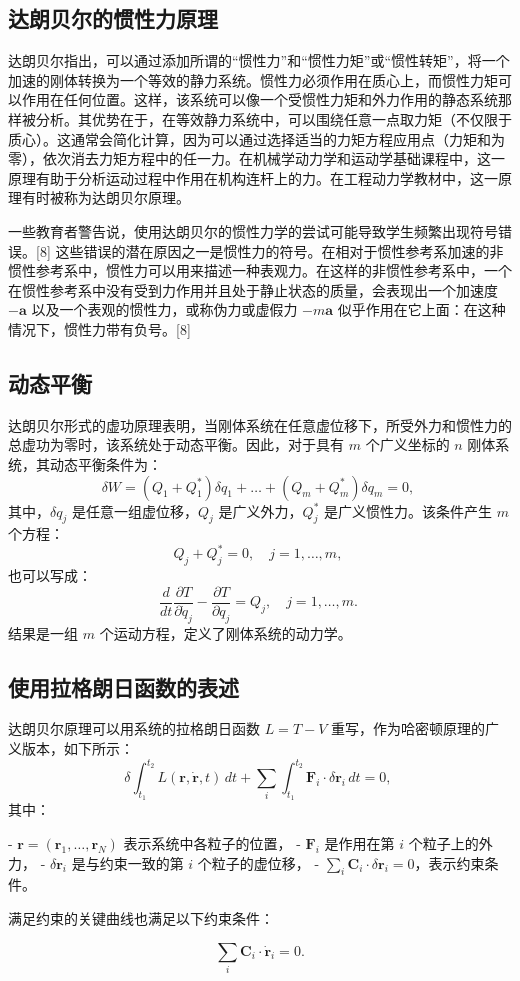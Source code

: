 \subsection{达朗贝尔的惯性力原理}
达朗贝尔指出，可以通过添加所谓的“惯性力”和“惯性力矩”或“惯性转矩”，将一个加速的刚体转换为一个等效的静力系统。惯性力必须作用在质心上，而惯性力矩可以作用在任何位置。这样，该系统可以像一个受惯性力矩和外力作用的静态系统那样被分析。其优势在于，在等效静力系统中，可以围绕任意一点取力矩（不仅限于质心）。这通常会简化计算，因为可以通过选择适当的力矩方程应用点（力矩和为零），依次消去力矩方程中的任一力。在机械学动力学和运动学基础课程中，这一原理有助于分析运动过程中作用在机构连杆上的力。在工程动力学教材中，这一原理有时被称为达朗贝尔原理。

一些教育者警告说，使用达朗贝尔的惯性力学的尝试可能导致学生频繁出现符号错误。[8] 这些错误的潜在原因之一是惯性力的符号。在相对于惯性参考系加速的非惯性参考系中，惯性力可以用来描述一种表观力。在这样的非惯性参考系中，一个在惯性参考系中没有受到力作用并且处于静止状态的质量，会表现出一个加速度 \(-\mathbf{a}\) 以及一个表观的惯性力，或称伪力或虚假力 \(-m\mathbf{a}\) 似乎作用在它上面：在这种情况下，惯性力带有负号。[8]
\subsection{动态平衡}
达朗贝尔形式的虚功原理表明，当刚体系统在任意虚位移下，所受外力和惯性力的总虚功为零时，该系统处于动态平衡。因此，对于具有 \( m \) 个广义坐标的 \( n \) 刚体系统，其动态平衡条件为：
\[
\delta W = \left(Q_1 + Q_1^{*}\right) \delta q_1 + \dots + \left(Q_m + Q_m^{*}\right) \delta q_m = 0,~
\]
其中，\( \delta q_j \) 是任意一组虚位移，\( Q_j \) 是广义外力，\( Q_j^{*} \) 是广义惯性力。该条件产生 \( m \) 个方程：
\[
Q_j + Q_j^{*} = 0, \quad j = 1, \dots, m,~
\]
也可以写成：
\[
\frac{d}{dt} \frac{\partial T}{\partial \dot{q}_j} - \frac{\partial T}{\partial q_j} = Q_j, \quad j = 1, \dots, m.~
\]
结果是一组 \( m \) 个运动方程，定义了刚体系统的动力学。
\subsection{使用拉格朗日函数的表述}
达朗贝尔原理可以用系统的拉格朗日函数 \( L = T - V \) 重写，作为哈密顿原理的广义版本，如下所示：
\[
\delta \int_{t_1}^{t_2} L(\mathbf{r}, \dot{\mathbf{r}}, t) \, dt + \sum_i \int_{t_1}^{t_2} \mathbf{F}_i \cdot \delta \mathbf{r}_i \, dt = 0,~
\]
其中：

- \( \mathbf{r} = (\mathbf{r}_1, \dots, \mathbf{r}_N) \) 表示系统中各粒子的位置，
- \( \mathbf{F}_i \) 是作用在第 \( i \) 个粒子上的外力，
- \( \delta \mathbf{r}_i \) 是与约束一致的第 \( i \) 个粒子的虚位移，
- \( \sum_i \mathbf{C}_i \cdot \delta \mathbf{r}_i = 0 \)，表示约束条件。

满足约束的关键曲线也满足以下约束条件：

\[
\sum_i \mathbf{C}_i \cdot \dot{\mathbf{r}}_i = 0.
\]